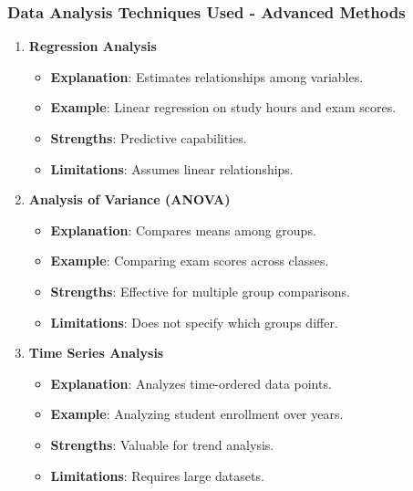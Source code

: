 \documentclass{beamer}
\begin{document}
\begin{frame}[fragile]
    \frametitle{Data Analysis Techniques Used - Advanced Methods}
    \begin{enumerate}[resume]
        \item \textbf{Regression Analysis}
            \begin{itemize}
                \item \textbf{Explanation}: Estimates relationships among variables.
                \item \textbf{Example}: Linear regression on study hours and exam scores.
                \item \textbf{Strengths}: Predictive capabilities.
                \item \textbf{Limitations}: Assumes linear relationships.
            \end{itemize}
        
        \item \textbf{Analysis of Variance (ANOVA)}
            \begin{itemize}
                \item \textbf{Explanation}: Compares means among groups.
                \item \textbf{Example}: Comparing exam scores across classes.
                \item \textbf{Strengths}: Effective for multiple group comparisons.
                \item \textbf{Limitations}: Does not specify which groups differ.
            \end{itemize}

        \item \textbf{Time Series Analysis}
            \begin{itemize}
                \item \textbf{Explanation}: Analyzes time-ordered data points.
                \item \textbf{Example}: Analyzing student enrollment over years.
                \item \textbf{Strengths}: Valuable for trend analysis.
                \item \textbf{Limitations}: Requires large datasets.
            \end{itemize}
    \end{enumerate}
\end{frame}
\end{document}
